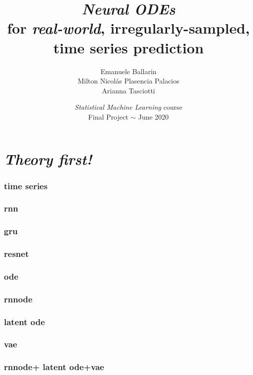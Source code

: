 \documentclass{beamer}
\title[\textit{Neural ODEs} for \textit{real-world}, irregularly-sampled, time series prediction]{\textit{Neural ODEs} \\ for \textit{real-world}, irregularly-sampled, time series prediction}
\author[E. Ballarin, M. N. Plasencia Palacios, A. Tasciotti]{Emanuele Ballarin \\ Milton Nicolás Plasencia Palacios \\ Arianna Tasciotti}
\institute[]{Department of Mathematics and Geosciences, University of Trieste}
\date[]{\textit{Statistical Machine Learning} course \\ Final Project $\sim$ June 2020}
\begin{document}
\frame{\titlepage}


\section{\textit{Theory first!}}{

\begin{frame}
\frametitle{time series}

\end{frame}
\begin{frame}
	\frametitle{rnn}
\end{frame}
\begin{frame}
	\frametitle{gru}
\end{frame}

\begin{frame}
	\frametitle{resnet}

\end{frame}
\begin{frame}
	\frametitle{ode}
\end{frame}
\begin{frame}
	\frametitle{rnnode}
\end{frame}
\begin{frame}
	\frametitle{latent ode}
\end{frame}
\begin{frame}
	\frametitle{vae}
\end{frame}
\begin{frame}
	\frametitle{rnnode+ latent ode+vae}
\end{frame}
}
\end{document}
